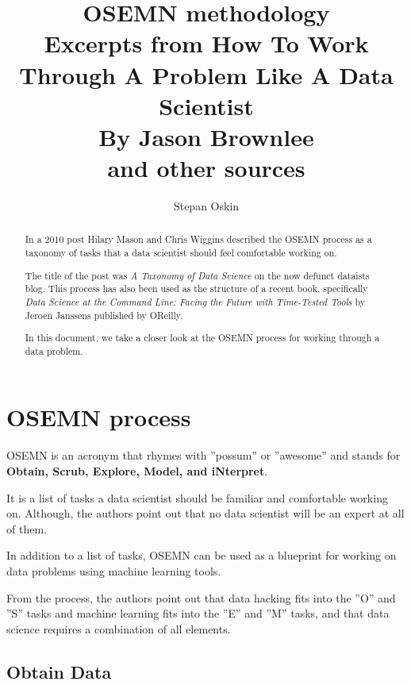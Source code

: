 \documentclass[11pt]{article}
\begin{document}
    \title{OSEMN methodology\\
    Excerpts from How To Work Through A Problem Like A Data Scientist \\
    By Jason Brownlee\cite{Brownlee2014} \\
    and other sources}


    \author{Stepan Oskin}

    \maketitle

    \begin{abstract}

        In a 2010 post Hilary Mason and Chris Wiggins described the OSEMN process as a taxonomy of tasks that a data scientist should feel comfortable working on.

        The title of the post was \textit{A Taxonomy of Data Science} on the now defunct dataists blog\cite{Mason2010}.
        This process has also been used as the structure of a recent book, specifically \textit{Data Science at the Command Line: Facing the Future with Time-Tested Tools} by Jeroen Janssens published by O\’Reilly\cite{Janssens}.

        In this document, we take a closer look at the OSEMN process for working through a data problem.
    \end{abstract}

    \section{OSEMN process} \label{sec:osemn}
    OSEMN is an acronym that rhymes with ''possum'' or ''awesome'' and stands for \textbf{Obtain, Scrub, Explore, Model, and iNterpret}.

    It is a list of tasks a data scientist should be familiar and comfortable working on.
    Although, the authors point out that no data scientist will be an expert at all of them.

    In addition to a list of tasks, OSEMN can be used as a blueprint for working on data problems using machine learning tools.

    From the process, the authors point out that data hacking fits into the ''O'' and ''S'' tasks and machine learning fits into the ''E'' and ''M'' tasks, and that data science requires a combination of all elements.

    \subsection{Obtain Data} \label{subsec:obtain}
\end{document}
